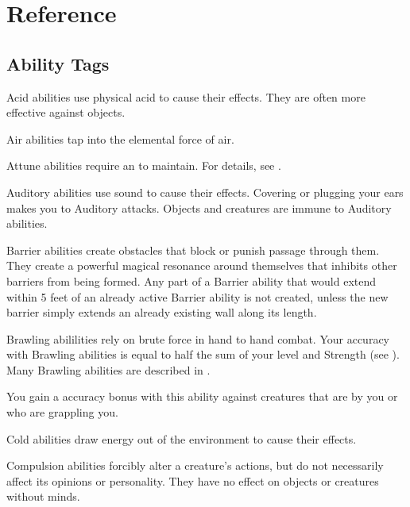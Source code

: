 \chapter{Reference}\label{Reference}

\section{Ability Tags}\label{Ability Tags}

   Acid abilities use physical acid to cause their effects.
  They are often more effective against objects.

   Air abilities tap into the elemental force of air.

   Attune abilities require an  to maintain.
  For details, see .

   Auditory abilities use sound to cause their effects.
  Covering or plugging your ears makes you \impervious to Auditory attacks.
  Objects and \deafened creatures are immune to Auditory abilities.

   Barrier abilities create obstacles that block or punish passage through them.
  They create a powerful magical resonance around themselves that inhibits other barriers from being formed.
  Any part of a Barrier ability that would extend within 5 feet of an already active Barrier ability is not created, unless the new barrier simply extends an already existing wall along its length.

   Brawling abililities rely on brute force in hand to hand combat.
  Your accuracy with Brawling abilities is equal to half the sum of your level and Strength (see ).
  Many Brawling abilities are described in .

   You gain a  accuracy bonus with this ability against creatures that are \grappled by you or who are grappling you.

   Cold abilities draw energy out of the environment to cause their effects.

   Compulsion abilities forcibly alter a creature's actions, but do not necessarily affect its opinions or personality.
  They have no effect on objects or creatures without minds.

